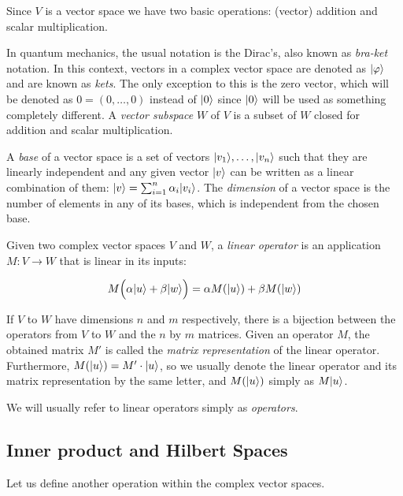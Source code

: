 Since $V$ is a vector space we have two basic operations: (vector) addition and scalar multiplication.

In quantum mechanics, the usual notation is the Dirac's, also known as \emph{bra-ket} notation. In this context, vectors in a complex vector space are denoted as $|\varphi\rangle$ and are known as \emph{kets}. The only exception to this is the zero vector, which will be denoted as $0 = (0, \dotsc, 0)$ instead of $|0\rangle$ since $|0\rangle$ will be used as something completely different. A \emph{vector subspace} $W$ of $V$ is a subset of $W$ closed for addition and scalar multiplication.

A \emph{base} of a vector space is a set of vectors $|v_1\rangle, \dotsc, |v_n\rangle$ such that they are linearly independent and any given vector $|v\rangle$ can be written as a linear combination of them: $|v\rangle = \sum_{i=1}^n \alpha_i|v_i\rangle$. The \emph{dimension} of a vector space is the number of elements in any of its bases, which is independent from the chosen base.

\begin{definition}
	Given two complex vector spaces $V$ and $W$, a \emph{linear operator} is an application $M: V \rightarrow W $ that is linear in its inputs:
	
	$$ M \Big( \alpha |u\rangle + \beta |w\rangle \Big) = \alpha M (|u\rangle) + \beta M (|w\rangle) $$
\end{definition}

If $V$ to $W$ have dimensions $n$ and $m$ respectively, there is a bijection between the operators from $V$ to $W$ and the $n$ by $m$ matrices. Given an operator $M$, the obtained matrix $M'$ is called the \emph{matrix representation} of the linear operator. Furthermore, $M(|u\rangle) = M' \cdot |u\rangle$, so we usually denote the linear operator and its matrix representation by the same letter, and $M(|u\rangle)$ simply as $M|u\rangle$.

We will usually refer to linear operators simply as \emph{operators}.


\subsection{Inner product and Hilbert Spaces}


Let us define another operation within the complex vector spaces.

